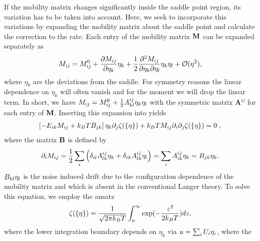 If the mobility matrix changes significantly inside the saddle point region, its variation has to be taken into account. 
Here, we seek to incorporate this variations by expanding the mobility matrix about the saddle point
and calculate the correction to the rate. 
Each entry of the mobility matrix $\mathbf{M}$ can be expanded separately as
\begin{equation}
M_{ij}=M_{ij}^0+\frac{\partial M_{ij}}{\partial \eta_k}\eta_k + \frac{1}{2}\frac{\partial^2 M_{ij}}{\partial \eta_k\partial \eta_l}\eta_k\eta_l+\mathcal{O}(\eta^2),
\end{equation}
where $\eta_k$ are the deviations from the saddle.
For symmetry reasons the linear dependence on $\eta_k$ will often vanish and for the moment we will drop 
the linear term. In short, we have 
$M_{ij}=M_{ij}^0+\frac{1}{2}A_{kl}^{ij}\eta_k\eta_l$
with the symmetric matrix $\mathbf{A}^{ij}$ for each entry of $\mathbf{M}$. 
Inserting this expansion into  yields
\begin{equation}
\begin{split}
\label{eq:flux_ansatz}
\left[-E_{ik}M_{ij} + k_BT B_{jk}\right]\eta_k\partial_j \zeta(\{\eta\})+
k_BT M_{ij} \partial_i \partial_j \zeta(\{\eta\})=0\;,
\end{split}
\end{equation}
where the matrix $\mathbf{B}$ is defined by 
\begin{equation}
\partial_i M_{ij}= \frac{1}{2}\sum_{i} \left(\delta_{il}A_{lk}^{ij}\eta_k+\delta_{ik}A_{lk}^{ij}\eta_l\right)=\sum_{i}A_{ik}^{ij}\eta_k=B_{jk}\eta_k.
\end{equation}
$B_{kl} \eta_l$ is the noise induced drift due to the configuration dependence of the 
mobility matrix and which is absent in the conventional Langer theory. 
To solve this equation, we employ the ansatz \cite{Haenggi_RevModPhys_90}
\begin{equation}
\zeta(\{\eta\})=\frac{1}{\sqrt{2\pi k_BT}}\int_u^{\infty}\exp(-\frac{z^2}{2k_BT}) dz,
\end{equation}
where the lower integration boundary depends on $\eta_k$ via $u=\sum_i U_i\eta_i$, where the 
